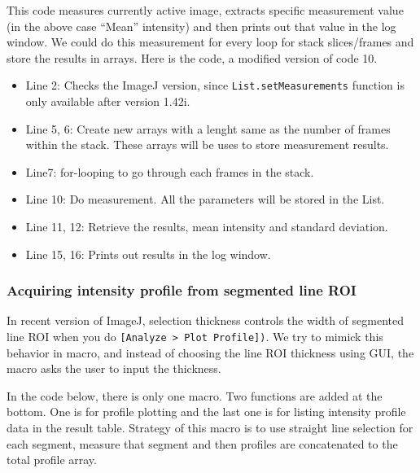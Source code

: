 \documentclass[11pt,a4paper,oneside]{report}
\newcommand{\ijmenu}[1]{\texttt{\small#1}}
\newcommand{\ilcom}[1]{\texttt{\small#1}}
\begin{document}
This code measures currently active image, extracts specific measurement value (in the above case ``Mean'' intensity) and then prints out that value in the log window. We could do this measurement for every loop for stack slices/frames and store the results in arrays. Here is the code, a modified version of code 10. 


\begin{itemize}
  \item Line 2: Checks the ImageJ version, since \ilcom{List.setMeasurements} function is only available after version 1.42i.
  \item Line 5, 6: Create new arrays with a lenght same as the number of frames within the stack. These arrays will be uses to store measurement results. 
  \item Line7: for-looping to go through each frames in the stack.
  \item Line 10: Do measurement. All the parameters will be stored in the List. 
  \item Line 11, 12: Retrieve the results, mean intensity and standard deviation. 
  \item Line 15, 16: Prints out results in the log window. 
\end{itemize}

\subsubsection{Acquiring intensity profile from segmented line ROI}
 
In recent version of ImageJ, selection thickness controls the width of segmented
line ROI when you do \ijmenu{[Analyze > Plot Profile])}. We try to mimick this
behavior in macro, and instead of choosing the line ROI thickness using GUI, the
macro asks the user to input the thickness. 

In the code below, there is only one macro. Two functions are added at the
bottom. One is for profile plotting and the last one is for listing
intensity profile data in the result table. Strategy of this macro is to use
straight line selection for each segment, measure that segment and then profiles
are concatenated to the total profile array.

%
%

\end{document}
